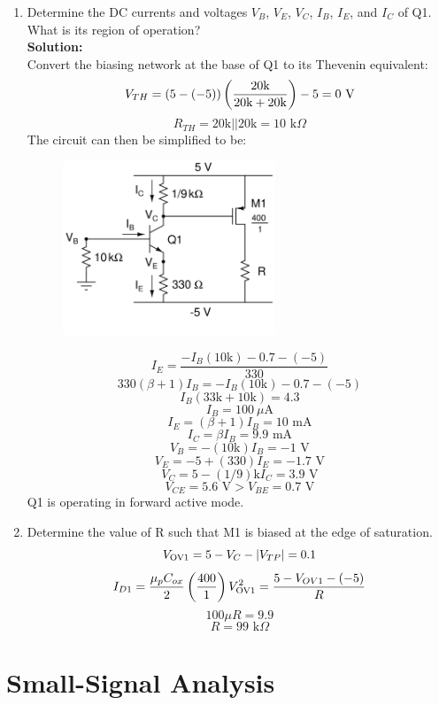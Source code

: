 \documentclass{article}
\begin{document}
\begin{enumerate}[label=\textbf{(\alph*)}]
    \item Determine the DC currents and voltages $V_B$, $V_E$, $V_C$, $I_B$, $I_E$, and $I_C$ of Q1.  What is its region of operation?
    \\

\textbf{Solution:} \\
Convert the biasing network at the base of Q1 to its Thevenin equivalent:
$$V_{TH} = \left(5- (-5)\right)\left(\frac{20 \rm k}{20 \rm k + 20 k}\right) - 5 = 0\text{ V}$$
$$R_{TH} = 20\text{k} || 20\text{k} = 10\text{ k}\Omega$$
\newpage
The circuit can then be simplified to be:
\begin{figure}[!h]
\begin{center}
    \includegraphics[width=0.6\textwidth]{figures/cc_dc1_sol.png}
\end{center}
\end{figure}
$$I_E = \frac{-I_B(10\text{k}) - 0.7 - (-5)}{330}$$
$$330(\beta + 1)I_B = -I_B(10\text{k}) - 0.7 - (-5)$$
$$I_B(33\text{k} + 10\text{k}) = 4.3$$
$$\boxed{I_B = 100\ \mu\text{A}}$$
$$\boxed{I_E = (\beta + 1)I_B = 10\text{ mA}}$$
$$\boxed{I_C = \beta I_B = 9.9\text{ mA}}$$
$$\boxed{V_{B} = -(10 \text{k})I_B = -1\text{ V}}$$
$$\boxed{V_{E} = -5 + (330)I_E = -1.7\text{ V}}$$
$$\boxed{V_{C} = 5 - (1/9)\text{k}I_C = 3.9\text{ V}}$$
$$V_{CE} = 5.6\text{ V} > V_{BE} = 0.7 \text{ V}$$
Q1 is operating in forward active mode.
    \item Determine the value of R such that M1 is biased at the edge of saturation.
$$V_{\rm OV1} = 5 - V_C - |V_{TP}| = 0.1$$
$$I_{D1} = \frac{\mu_p C_{ox}}{2}\left(\frac{400}{1}\right)V_{\rm OV1}^2 = \frac{5 - V_{OV1} - (-5)}{R}$$
$$100\mu R = 9.9$$
$$\boxed{R = 99\text{ k}\Omega}$$
\end{enumerate}
\newpage
\section*{Small-Signal Analysis}
\end{document}
